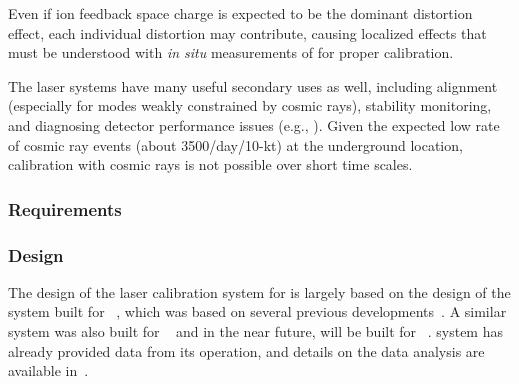 Even if ion feedback space charge is expected to be the dominant \efield distortion effect,
each individual \efield distortion may contribute, causing localized effects that must be understood with \textit{in situ} measurements of \efield for proper calibration. 

The laser systems have many useful secondary uses as well, including alignment (especially for modes weakly constrained by cosmic rays),
stability monitoring, and diagnosing detector performance issues
(e.g., ).  
Given the expected low rate of cosmic ray events (about 3500/day/10-kt) at the underground location, calibration with cosmic rays is not possible over short time scales. 






\subsubsection{Requirements}
\label{sec:dp-calib-laser-req}



\subsubsection{Design}
\label{sec:sp-calib-sys-las-ion-des}

The design of the laser calibration system for  is largely based on the design of the system built for ~\cite{microboone}, which was based on several previous developments~\cite{Rossi:2009im,Zeller:2013sva,Ereditato:2014lra,Ereditato:82014tya}. A similar system was also built for ~\cite{Berns:2013usa} and in the near future, will be built for ~\cite{Antonello:2015lea}.  system has already provided data from its operation, and details on the data analysis are available in~\cite{bib:uBlaser2019}.

